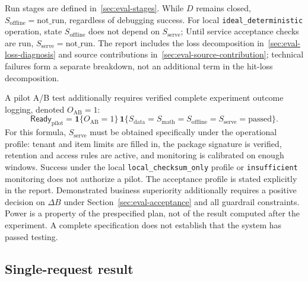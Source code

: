 \documentclass[12pt,a4paper]{article}
\newcommand{\code}[1]{{\ttfamily\small\nolinkurl{#1}}}
\newcommand{\ind}{\mathbf 1}
\theoremstyle{plainru}
\begin{document}
Run stages are defined in~\ref{sec:eval-stages}. While $D$ remains closed,
$S_{\mathrm{offline}}=\mathrm{not\_run}$, regardless of debugging success.
For local \code{ideal_deterministic} operation, state
$S_{\mathrm{offline}}$ does not depend on $S_{\mathrm{serve}}$;
Until service acceptance checks are run, $S_{\mathrm{serve}}=\mathrm{not\_run}$.
The report includes the loss decomposition in~\ref{sec:eval-loss-diagnosis}
and source contributions in~\ref{sec:eval-source-contribution}; technical failures
form a separate breakdown, not an additional term in the hit-loss decomposition.

A pilot A/B test additionally requires verified
complete experiment outcome logging, denoted $O_{\mathrm{AB}}=1$:
\begin{equation}\label{eq:acceptance-pilot}
\mathsf{Ready}_{\mathrm{pilot}}=
\ind\{O_{\mathrm{AB}}=1\}\,
\ind\{S_{\mathrm{data}}=S_{\mathrm{math}}=
S_{\mathrm{offline}}=S_{\mathrm{serve}}=\mathrm{passed}\}.
\end{equation}
For this formula, $S_{\mathrm{serve}}$ must be obtained specifically
under the operational profile: tenant and item limits are filled in,
the package signature is verified, retention and access rules are active,
and monitoring is calibrated on enough windows. Success under the local
\code{local_checksum_only} profile or \code{insufficient} monitoring
does not authorize a pilot. The acceptance profile is stated explicitly in the report.
Demonstrated business superiority additionally requires a positive
decision on \(\Delta B\) under Section~\ref{sec:eval-acceptance}
and all guardrail constraints. Power is a property of the prespecified
plan, not of the result computed after the experiment.
A complete specification does not establish that the system has passed testing.

\subsection{Single-request result}
\end{document}
